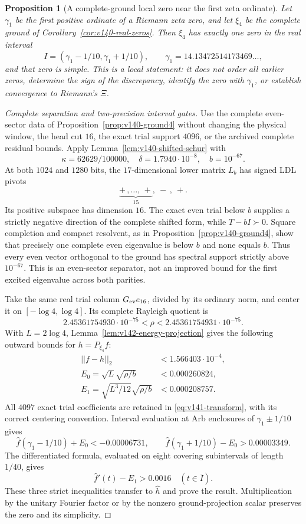 \documentclass[11pt]{article}
\def\norm#1{||#1||}%
\newtheorem{proposition}[theorem]{Proposition}
\theoremstyle{remark}
\newcommand{\norm}[1]{\left\lVert #1\right\rVert}
\begin{document}
\begin{proposition}[A complete-ground local zero near the first zeta ordinate]
\label{prop:v142-ground-zero}
Let $\gamma_1$ be the first positive ordinate of a Riemann zeta zero,
and let $\xi_4$ be the complete ground of
Corollary~\ref{cor:v140-real-zeros}. Then $\widehat\xi_4$ has exactly
one zero in the real interval
\[
 I=(\gamma_1-1/10,\gamma_1+1/10),
 \qquad \gamma_1=14.13472514173469\ldots,
\]
and that zero is simple. This is a local statement: it does not order
all earlier zeros, determine the sign of the discrepancy, identify
the zero with $\gamma_1$, or establish convergence to Riemann's $\Xi$.
\end{proposition}
\begin{proof}[Complete separation and two-precision interval gates]
Use the complete even-sector data of
Proposition~\ref{prop:v140-ground4} without changing the physical window,
the head cut $16$, the exact trial support $4096$, or the archived
complete residual bounds. Apply Lemma~\ref{lem:v140-shifted-schur} with
\[
 \kappa=62629/100000,\quad \delta=1.7940\cdot10^{-8},
 \quad b=10^{-67}.
\]
At both $1024$ and $1280$ bits, the $17$-dimensional lower matrix
$L_b$ has signed LDL pivots
\[
 \underbrace{+\,,\ldots,\,+}_{15},\ -\,,\ +.
\]
Its positive subspace has dimension $16$. The exact even trial below
$b$ supplies a strictly negative direction of the complete shifted
form, while $T-bI\succ0$. Square completion and compact resolvent,
as in Proposition~\ref{prop:v140-ground4}, show that precisely one
complete even eigenvalue is below $b$ and none equals $b$.
Thus every even vector orthogonal to the ground has spectral support
strictly above $10^{-67}$. This is an even-sector separator, not an
improved bound for the first excited eigenvalue across both parities.

Take the same real trial column $G_{\rm ev}e_{16}$, divided by its
ordinary norm, and center it on $[-\log4,\log4]$. Its complete
Rayleigh quotient is
\[
 2.45361754930\cdot10^{-75}<\rho<2.45361754931\cdot10^{-75}.
\]
With $L=2\log4$, Lemma~\ref{lem:v142-energy-projection} gives the
following outward bounds for $h=P_{\xi_4}f$:
\begin{align*}
 \norm{f-h}_2&<1.566403\cdot10^{-4},\\
 E_0=\sqrt L\sqrt{\rho/b}&<0.000260824,\\
 E_1=\sqrt{L^3/12}\sqrt{\rho/b}&<0.000208757.
\end{align*}
All $4097$ exact trial coefficients are retained in
\eqref{eq:v141-transform}, with its correct centering convention.
Interval evaluation at Arb enclosures of $\gamma_1\pm1/10$ gives
\[
 \widehat f(\gamma_1-1/10)+E_0<-0.00006731,
 \qquad
 \widehat f(\gamma_1+1/10)-E_0>0.00003349.
\]
The differentiated formula, evaluated on eight covering subintervals
of length $1/40$, gives
\[
 \widehat f'(t)-E_1>0.0016\quad(t\in\overline I).
\]
These three strict inequalities transfer to $\widehat h$ and prove
the result. Multiplication by the unitary Fourier factor or by the
nonzero ground-projection scalar preserves the zero and its simplicity.


\end{proof}
\end{document}
